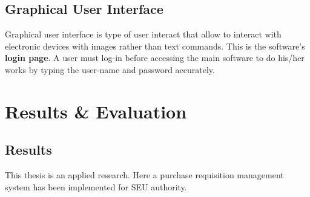\documentclass[12pt]{report} %
\begin{document}

\clearpage










\ifx
\section{Graphical User Interface}
Graphical user interface is type of user interact that allow to interact with electronic devices with images rather than text commands. This is the software's \textbf{login page}. A user must log-in before accessing the main software to do his/her works by typing the user-name and password accurately. 
\fi






















\ifx
\chapter{Results \& Evaluation}
\setcounter{page}{1}
\thispagestyle{empty}    %

\section{Results}
This thesis is an applied research. Here a purchase requisition management system has been implemented for SEU authority.
\fi
\end{document}
